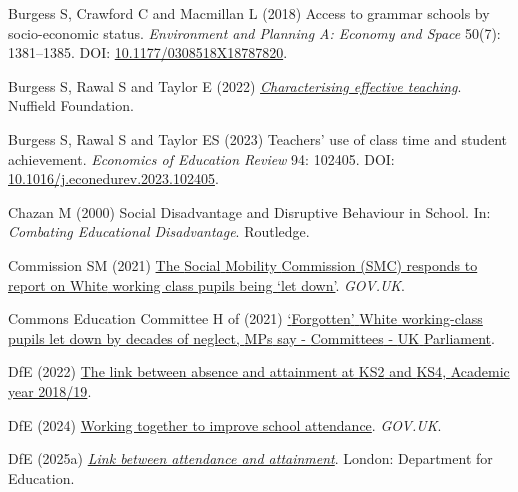 \documentclass[
  11pt,
]{article}
\newlength{\cslhangindent}
\newenvironment{CSLReferences}[2] %
 {\begin{list}{}{%
  \setlength{\itemindent}{0pt}
  \setlength{\leftmargin}{0pt}
  \setlength{\parsep}{0pt}
  \ifodd #1
   \setlength{\leftmargin}{\cslhangindent}
   \setlength{\itemindent}{-1\cslhangindent}
  \fi
  \setlength{\itemsep}{#2\baselineskip}}}
 {\end{list}}
\begin{document}
\begin{CSLReferences}{1}{1}
Burgess S, Crawford C and Macmillan L (2018) Access to grammar schools
by socio-economic status. \emph{Environment and Planning A: Economy and
Space} 50(7): 1381--1385. DOI:
\href{https://doi.org/10.1177/0308518X18787820}{10.1177/0308518X18787820}.

Burgess S, Rawal S and Taylor E (2022)
\emph{\href{https://www.nuffieldfoundation.org/project/characterising-effective-teaching-2}{Characterising
effective teaching}}. Nuffield Foundation.

Burgess S, Rawal S and Taylor ES (2023) Teachers' use of class time and
student achievement. \emph{Economics of Education Review} 94: 102405.
DOI:
\href{https://doi.org/10.1016/j.econedurev.2023.102405}{10.1016/j.econedurev.2023.102405}.

Chazan M (2000) Social {Disadvantage} and {Disruptive} {Behaviour} in
{School}. In: \emph{Combating {Educational} {Disadvantage}}. Routledge.

Commission SM (2021)
\href{https://www.gov.uk/government/news/smc-responds-to-report-on-white-working-class-pupils-being-let-down}{The
{Social} {Mobility} {Commission} ({SMC}) responds to report on {White}
working class pupils being {`let down'}}. \emph{GOV.UK}.

Commons Education Committee H of (2021)
\href{https://committees.parliament.uk/committee/203/education-committee/news/156024/forgotten-white-workingclass-pupils-let-down-by-decades-of-neglect-mps-say/}{{`{Forgotten}'}
{White} working-class pupils let down by decades of neglect, {MPs} say -
{Committees} - {UK} {Parliament}}.

DfE (2022)
\href{https://explore-education-statistics.service.gov.uk/find-statistics/the-link-between-absence-and-attainment-at-ks2-and-ks4/2018-19}{The
link between absence and attainment at {KS2} and {KS4}, {Academic} year
2018/19}.

DfE (2024)
\href{https://www.gov.uk/government/publications/working-together-to-improve-school-attendance}{Working
together to improve school attendance}. \emph{GOV.UK}.

DfE (2025a)
\emph{\href{https://www.gov.uk/government/publications/link-between-attendance-and-attainment}{Link
between attendance and attainment}}. London: Department for Education.


\end{CSLReferences}
\end{document}
